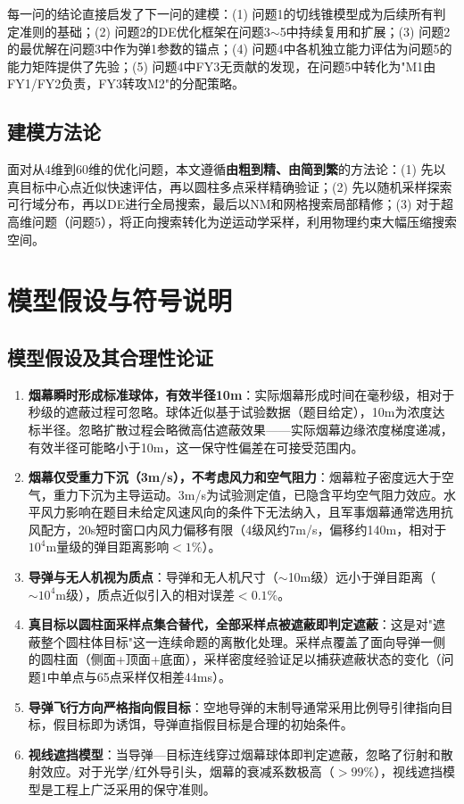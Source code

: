 \documentclass[12pt,a4paper]{ctexart}
\begin{document}
每一问的结论直接启发了下一问的建模：(1) 问题1的切线锥模型成为后续所有判定准则的基础；(2) 问题2的DE优化框架在问题3$\sim$5中持续复用和扩展；(3) 问题2的最优解在问题3中作为弹1参数的锚点；(4) 问题4中各机独立能力评估为问题5的能力矩阵提供了先验；(5) 问题4中FY3无贡献的发现，在问题5中转化为"M1由FY1/FY2负责，FY3转攻M2"的分配策略。

\subsection{建模方法论}

面对从4维到60维的优化问题，本文遵循\textbf{由粗到精、由简到繁}的方法论：(1) 先以真目标中心点近似快速评估，再以圆柱多点采样精确验证；(2) 先以随机采样探索可行域分布，再以DE进行全局搜索，最后以NM和网格搜索局部精修；(3) 对于超高维问题（问题5），将正向搜索转化为逆运动学采样，利用物理约束大幅压缩搜索空间。

\section{模型假设与符号说明}

\subsection{模型假设及其合理性论证}

\begin{enumerate}[label=(\arabic*)]
    \item \textbf{烟幕瞬时形成标准球体，有效半径10m}：实际烟幕形成时间在毫秒级\cite{smoke_military}，相对于秒级的遮蔽过程可忽略。球体近似基于试验数据（题目给定），10m为浓度达标半径。忽略扩散过程会略微高估遮蔽效果——实际烟幕边缘浓度梯度递减，有效半径可能略小于10m，这一保守性偏差在可接受范围内。
    \item \textbf{烟幕仅受重力下沉（3m/s），不考虑风力和空气阻力}：烟幕粒子密度远大于空气，重力下沉为主导运动。3m/s为试验测定值，已隐含平均空气阻力效应。水平风力影响在题目未给定风速风向的条件下无法纳入，且军事烟幕通常选用抗风配方，20s短时窗口内风力偏移有限（4级风约7m/s，偏移约140m，相对于$10^4$m量级的弹目距离影响$<1\%$）。
    \item \textbf{导弹与无人机视为质点}：导弹和无人机尺寸（$\sim$10m级）远小于弹目距离（$\sim10^4$m级），质点近似引入的相对误差$<0.1\%$。
    \item \textbf{真目标以圆柱面采样点集合替代，全部采样点被遮蔽即判定遮蔽}：这是对"遮蔽整个圆柱体目标"这一连续命题的离散化处理。采样点覆盖了面向导弹一侧的圆柱面（侧面+顶面+底面），采样密度经验证足以捕获遮蔽状态的变化（问题1中单点与65点采样仅相差44ms）。
    \item \textbf{导弹飞行方向严格指向假目标}：空地导弹的末制导通常采用比例导引律指向目标，假目标即为诱饵，导弹直指假目标是合理的初始条件。
    \item \textbf{视线遮挡模型}：当导弹—目标连线穿过烟幕球体即判定遮蔽，忽略了衍射和散射效应。对于光学/红外导引头，烟幕的衰减系数极高（$>99\%$），视线遮挡模型是工程上广泛采用的保守准则\cite{los_guidance}。
\end{enumerate}
\end{document}
